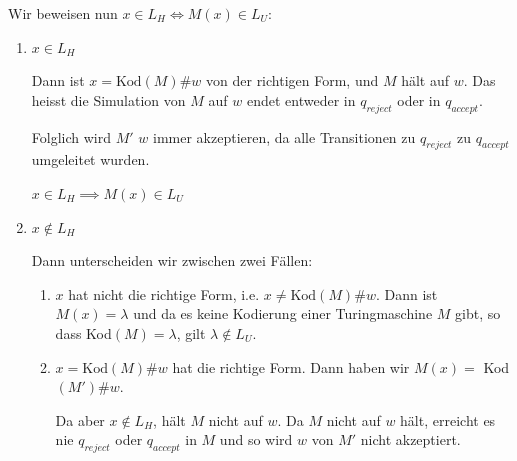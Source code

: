 \documentclass[a4paper, 11pt]{article}
\begin{document}
                        
                    Wir beweisen nun $x \in L_H \iff M(x) \in L_U$:
                
                        \begin{enumerate}[label=(\roman*)]
                            \item $x \in L_H$
                
                                Dann ist $x = \text{Kod}(M)\#w$ von der richtigen Form, und $M$ hält auf $w$. 
                                Das heisst die Simulation von $M$ auf $w$ endet entweder in $q_{reject}$ oder in $q_{accept}$. 
                                
                                Folglich wird $M'$ $w$ immer akzeptieren, da alle Transitionen zu $q_{reject}$ zu $q_{accept}$ umgeleitet wurden. 
                                
                                $x \in L_H \implies M(x) \in L_U$
                
                            \item $x \notin L_H$
                
                                Dann unterscheiden wir zwischen zwei Fällen:
                
                                \begin{enumerate}[label=(\alph*)]
                                    \item 
                                    
                                    $x$ hat nicht die richtige Form, i.e. $x \neq \text{Kod}(M)\#w$.
                                    Dann ist $M(x) = \lambda$ und da es keine Kodierung einer Turingmaschine $M$ gibt, so dass Kod$(M) = \lambda$, gilt   $\lambda \notin L_U$.
                            
                
                   
                    \item
                
                                    $x = \text{Kod}(M)\#w$ hat die richtige Form. Dann haben wir $M(x) = $ Kod$(M')\#w$.
                                    
                                    Da aber $x \notin L_H$, hält $M$ nicht auf $w$. Da $M$ nicht auf $w$ hält, erreicht es nie $q_{reject}$ oder $q_{accept}$ in $M$ und so wird $w$ von $M'$ nicht akzeptiert. 
                

\end{enumerate}
\end{enumerate}
\end{document}
